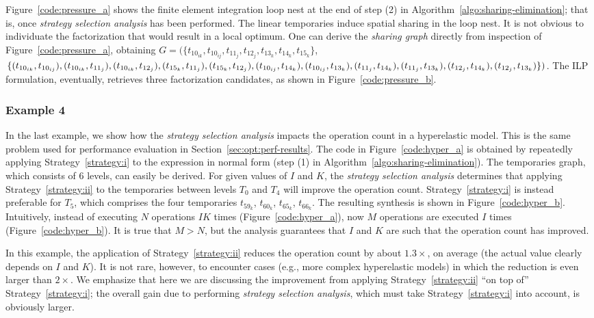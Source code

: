 Figure~\ref{code:pressure_a} shows the finite element integration loop nest at the end of step (2) in Algorithm~\ref{algo:sharing-elimination}; that is, once {\em strategy selection analysis} has been performed. The linear temporaries induce spatial sharing in the loop nest. It is not obvious to individuate the factorization that would result in a local optimum. One can derive the {\em sharing graph} directly from inspection of Figure~\ref{code:pressure_a}, obtaining $G = (\lbrace t_{10_{ik}}, t_{10_{ij}}, t_{11_{j}}, t_{12_{j}}, t_{13_{k}}, t_{14_{k}}, t_{15_{k}}\rbrace$, $\lbrace (t_{10_{ik}},t_{10_{ij}}), (t_{10_{ik}},t_{11_{j}}), (t_{10_{ik}},t_{12_{j}}), (t_{15_{k}},t_{11_{j}}), (t_{15_{k}},t_{12_{j}}), (t_{10_{ij}},t_{14_{k}}), (t_{10_{ij}},t_{13_{k}}),\\ (t_{11_{j}},t_{14_{k}}), (t_{11_{j}},t_{13_{k}}), (t_{12_{j}},t_{14_{k}}), (t_{12_{j}},t_{13_{k}}) \rbrace)$. The ILP formulation, eventually, retrieves three factorization candidates, as shown in Figure~\ref{code:pressure_b}.

\subsubsection{Example 4}
In the last example, we show how the {\em strategy selection analysis} impacts the operation count in a hyperelastic model. This is the same problem used for performance evaluation in Section~\ref{sec:opt:perf-results}. The code in Figure~\ref{code:hyper_a} is obtained by repeatedly applying Strategy~\ref{strategy:i} to the expression in normal form (step (1) in Algorithm~\ref{algo:sharing-elimination}). The temporaries graph, which consists of 6 levels, can easily be derived. For given values of $I$ and $K$, the {\em strategy selection analysis} determines that applying Strategy~\ref{strategy:ii} to the temporaries between levels $T_0$ and $T_4$ will improve the operation count. Strategy~\ref{strategy:i} is instead preferable for $T_5$, which comprises the four temporaries $t_{59_k}$, $t_{60_k}$, $t_{65_k}$, $t_{66_k}$. The resulting synthesis is shown in Figure~\ref{code:hyper_b}. Intuitively, instead of executing $N$ operations $I K$ times (Figure~\ref{code:hyper_a}), now $M$ operations are executed $I$ times (Figure~\ref{code:hyper_b}). It is true that $M > N$, but the analysis guarantees that $I$ and $K$ are such that the operation count has improved. 

In this example, the application of Strategy~\ref{strategy:ii} reduces the operation count by about $1.3 \times$, on average (the actual value clearly depends on $I$ and $K$). It is not rare, however, to encounter cases (e.g., more complex hyperelastic models) in which the reduction is even larger than $2 \times$. We emphasize that here we are discussing the improvement from applying Strategy~\ref{strategy:ii} ``on top of'' Strategy~\ref{strategy:i}; the overall gain due to performing {\em strategy selection analysis}, which must take Strategy~\ref{strategy:i} into account, is obviously larger.


